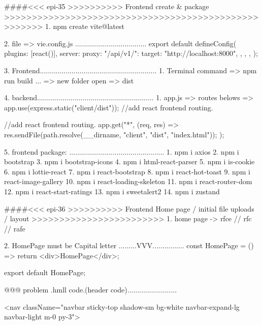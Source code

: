 ####<<< epi-35 >>>>>>>>>> Frontend create & package >>>>>>>>>>>>>>>>>>>>>>>>>>>>>>>>>>>>>>>>>>>>>>>>>>>>>
1. npm create vite@latest

2. file => vie.config.js ....................................
export default defineConfig({
  plugins: [react()],
  server: {
    proxy: {
      "/api/v1/": {
        target: "http://localhost:8000",
      },
    },
  },
});

3. Frontend...........................................................
   1. Terminal command => npm run build ...
      => new folder open => dist 

4. backend...........................................................
   1. app.js => routes belows => 
   app.use(express.static("client/dist")); //add react frontend routing. 

   //add react frontend routing.
   app.get("*", (req, res) => {
      res.sendFile(path.resolve(__dirname, "client", "dist", "index.html"));
   });

5. frontend package: ................................................
   1. npm i axios 
   2. npm i bootstrap
   3. npm i bootstrap-icons
   4. npm i html-react-parser
   5. npm i is-cookie
   6. npm i lottie-react
   7. npm i react-bootstrap
   8. npm i react-hot-toast
   9. npm i react-image-gallery
   10. npm i react-loading-skeleton
   11. npm i react-router-dom
   12. npm i react-start-ratings
   13. npm i sweetalert2
   14. npm i zustand


####<<< epi-36 >>>>>>>>>> Frontend Home page / initial file uploads / layout >>>>>>>>>>>>>>>>>>>>>>>>
   1. home page -> rfce // rfc // rafe


  2. HomePage must be Capital letter .........VVV................
       const HomePage = () =>  {
          return <div>HomePage</div>;
          }

         export default HomePage;

@@@ problem .hmll code.(header code).........................

       <nav className="navbar sticky-top shadow-sm bg-white navbar-expand-lg navbar-light m-0 py-3">


